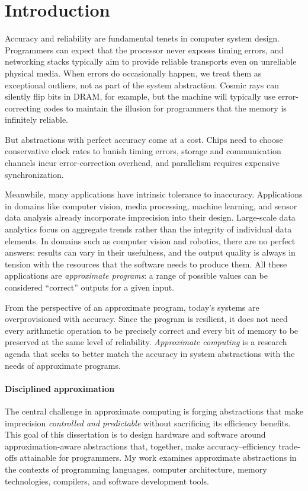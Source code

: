 \section{Introduction}
\label{sec:intro}

Accuracy and reliability are fundamental tenets in computer system design.
Programmers can expect that the processor never exposes timing
errors, and networking stacks typically aim to provide reliable transports
even on unreliable physical media.
When errors do occasionally happen, we treat them as exceptional outliers, not
as part of the system abstraction.
Cosmic rays can silently flip bits in DRAM, for example,
but the machine will typically use error-correcting codes to
maintain the illusion for programmers that the memory is infinitely reliable.

But abstractions with perfect accuracy come at a cost.
Chips need to choose conservative clock rates to banish timing errors,
storage and communication channels incur error-correction overhead,
and parallelism requires expensive synchronization.

Meanwhile, many applications have intrinsic tolerance to inaccuracy.
Applications in domains like computer vision, media
processing, machine learning, and sensor data analysis already incorporate
imprecision into their design.
Large-scale data analytics focus on aggregate trends rather than the integrity
of individual data elements.
In domains such as computer vision and robotics, there are no perfect answers:
results can vary in their usefulness, and the output quality is always in
tension with the resources that the software needs to produce them.
All these applications are \emph{approximate
programs}: a range of possible values can be considered ``correct'' outputs
for a given input.

From the perspective of an approximate program, today's
systems are overprovisioned with accuracy. Since the program is resilient, it
does
not need every arithmetic operation to be precisely correct and every bit of
memory to be preserved at the same level of reliability.
\emph{Approximate computing} is a research agenda that seeks to better match
the accuracy in system abstractions with the needs of approximate
programs.


\paragraph{Disciplined approximation}

The central challenge in approximate computing is forging abstractions that
make imprecision \emph{controlled and predictable} without sacrificing its
efficiency benefits.
This goal of this dissertation is to design hardware and software around
approximation-aware abstractions that, together, make accuracy--efficiency
trade-offs attainable for programmers.
My work examines approximate abstractions
in the contexts of programming languages, computer architecture,
memory technologies, compilers, and software development
tools.

